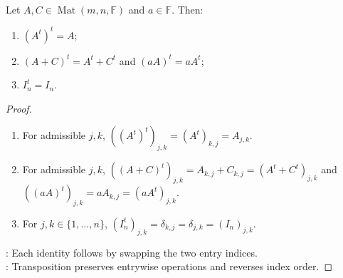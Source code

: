 \begin{proposition} \label{prop:elementary-transpose-rules} \\
Let $A,C\in\operatorname{Mat}(m,n,\mathbb{F})$ and $a\in\mathbb{F}$. Then:
\begin{enumerate}[label=(\roman*)]
\setlength{\itemsep}{0pt}
\item $(A^t)^t=A$;
\item $(A+C)^t=A^t+C^t$ and $(aA)^t=aA^t$;
\item $I_n^t=I_n$.
\end{enumerate}
\begin{proof}
\begin{enumerate}[label=(\roman*)]
\setlength{\itemsep}{0pt}
\item For admissible $j,k$, $((A^t)^t)_{j,k}=(A^t)_{k,j}=A_{j,k}$.
\item For admissible $j,k$, $((A+C)^t)_{j,k}=A_{k,j}+C_{k,j}=(A^t+C^t)_{j,k}$ and $((aA)^t)_{j,k}=aA_{k,j}=(aA^t)_{j,k}$.
\item For $j,k\in\{1,\ldots,n\}$, $(I_n^t)_{j,k}=\delta_{k,j}=\delta_{j,k}=(I_n)_{j,k}$.
\end{enumerate}
: Each identity follows by swapping the two entry indices.\\
: Transposition preserves entrywise operations and reverses index order.
\end{proof}
\end{proposition}

